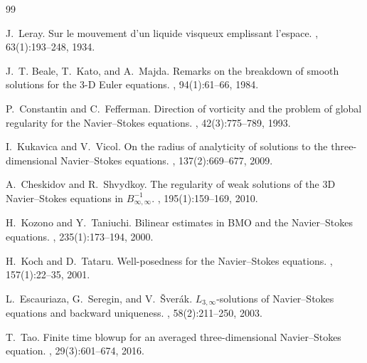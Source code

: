 \documentclass[11pt,a4paper]{article}
\theoremstyle{definition}
\theoremstyle{remark}
\begin{document}
\begin{thebibliography}{99}

J.~Leray.
\newblock Sur le mouvement d'un liquide visqueux emplissant l'espace.
, 63(1):193--248, 1934.

J.~T. Beale, T.~Kato, and A.~Majda.
\newblock Remarks on the breakdown of smooth solutions for the 3-{D} {E}uler equations.
, 94(1):61--66, 1984.

P.~Constantin and C.~Fefferman.
\newblock Direction of vorticity and the problem of global regularity for the {N}avier--{S}tokes equations.
, 42(3):775--789, 1993.

I.~Kukavica and V.~Vicol.
\newblock On the radius of analyticity of solutions to the three-dimensional {N}avier--{S}tokes equations.
, 137(2):669--677, 2009.

A.~Cheskidov and R.~Shvydkoy.
\newblock The regularity of weak solutions of the 3{D} {N}avier--{S}tokes equations in $B^{-1}_{\infty,\infty}$.
, 195(1):159--169, 2010.

H.~Kozono and Y.~Taniuchi.
\newblock Bilinear estimates in {BMO} and the {N}avier--{S}tokes equations.
, 235(1):173--194, 2000.

H.~Koch and D.~Tataru.
\newblock Well-posedness for the {N}avier--{S}tokes equations.
, 157(1):22--35, 2001.

L.~Escauriaza, G.~Seregin, and V.~\v{S}ver\'ak.
\newblock $L_{3,\infty}$-solutions of {N}avier--{S}tokes equations and backward uniqueness.
, 58(2):211--250, 2003.

T.~Tao.
\newblock Finite time blowup for an averaged three-dimensional {N}avier--{S}tokes equation.
, 29(3):601--674, 2016.

\end{thebibliography}
\end{document}
